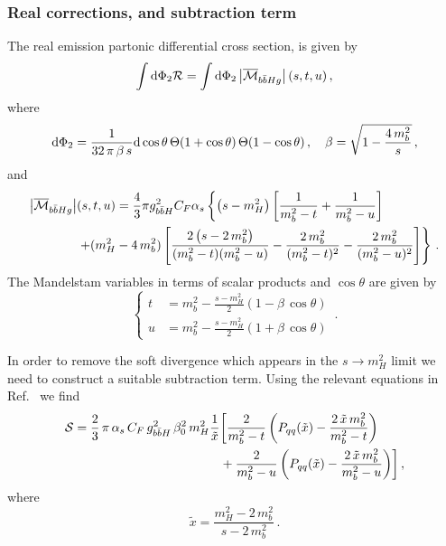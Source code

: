 \subsubsection{Real corrections, and subtraction term}
The real emission partonic differential cross section, is given by
\begin{equation}
 \int {\rm d} \Phi_{2}  {\cal R} =\int {\rm d} \Phi_{2}  \left| \overline{{\cal M}}_{b\bar{b}Hg} \right|(s,t,u)\,,
\end{equation}
where 
\begin{equation}
  {\rm d} \Phi_{2}=\frac{1}{32\,\pi\,\beta\,s} {\rm d}\cos\theta\,
  \Theta(1+\cos\theta )\,\Theta(1-\cos\theta)\, , \quad
  \beta=\sqrt{1-\frac{4\,m_b^2}{s}}\,,
\end{equation}
and
\begin{equation}
  \label{eq:real}
  \begin{split}
    \left| \overline{{\cal M}}_{b\bar{b}Hg} \right|&(s,t,u) = 
    \frac{4}{3}\pi g_{b\bar{b}H}^2C_F\alpha_s
    \left\{
      \left( s-m_H^2\right)\left[ \frac{1}{m_b^2-t}
        + \frac{1}{m_b^2-u}\right]
    \right.\\
    &
    \left.+ (m_H^2-4\,m_b^2)
      \left[
        \frac{2\left( s-2\,m_b^2 \right)}{(m_b^2-t)(m_b^2-u)} -
        \frac{2\,m_b^2}{(m_b^2-t)^2} -
        \frac{2\,m_b^2}{(m_b^2-u)^2}
      \right]
    \right\}\,.
  \end{split}
\end{equation}
The Mandelstam variables in terms of scalar
products and $\cos\theta$ are given by
\begin{equation}
  \left\{
    \begin{split}
      t &= m_b^2 - \frac{s-m_H^2}{2}\left( 1-\beta\,\cos\theta\right)\\
      u &= m_b^2 - \frac{s-m_H^2}{2}\left( 1+\beta\,\cos\theta\right) 
    \end{split}
  \right.\,.
\end{equation}

In order to remove the soft divergence which appears in the  $s\rightarrow
m_H^2$ limit we need to construct a suitable  subtraction term. Using
the relevant 
equations in Ref.~\cite{Krauss:2017wmx} we find
\begin{align}
  \label{eq:sub}
  {\cal S} =
  \frac{2}{3}\,\pi \,\alpha_s\,C_F\,g_{b\bar{b}H}^2\,\beta_0^2\,m_H^2
  \frac{1}{\tilde{x}}&
  \biggl[\frac{2}{m_b^2-t}\left( P_{qq}(\tilde{x})-\frac{2\,\tilde{x}\,m_b^2}{m_b^2-t} \right) \nonumber \\
    &+\frac{2}{m_b^2-u}\left( P_{qq}(\tilde{x})-\frac{2\,\tilde{x}\,m_b^2}{m_b^2-u} \right)\biggr]\,,
\end{align}
where
\begin{equation}
  \tilde{x} = \frac{m_H^2-2\,m_b^2}{s-2\,m_b^2}\,.
\end{equation}

